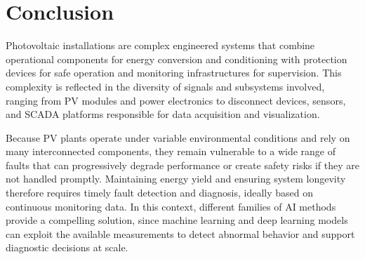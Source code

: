 

\section{Conclusion}
\label{sec:ch1-conclusion}

Photovoltaic installations are complex engineered systems that combine operational components for energy conversion and conditioning with protection devices for safe operation and monitoring infrastructures for supervision. This complexity is reflected in the diversity of signals and subsystems involved, ranging from PV modules and power electronics to disconnect devices, sensors, and SCADA platforms responsible for data acquisition and visualization.

Because PV plants operate under variable environmental conditions and rely on many interconnected components, they remain vulnerable to a wide range of faults that can progressively degrade performance or create safety risks if they are not handled promptly. Maintaining energy yield and ensuring system longevity therefore requires timely fault detection and diagnosis, ideally based on continuous monitoring data. In this context, different families of AI methods provide a compelling solution, since machine learning and deep learning models can exploit the available measurements to detect abnormal behavior and support diagnostic decisions at scale.